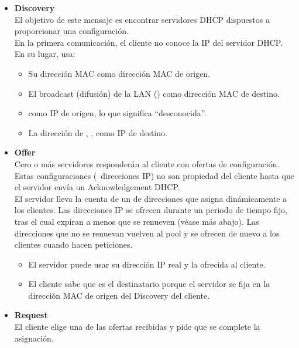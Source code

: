 \begin{itemize}

\item \textbf{Discovery}\\
El objetivo de este mensaje es encontrar servidores DHCP dispuestos a proporcionar
una configuración.\\[-0.3cm]

En la primera comunicación, el cliente
no conoce la IP del servidor DHCP. En su lugar, usa:
\begin{itemize}
\item Su dirección MAC como dirección MAC de origen.
\item El broadcast (difusión) de la LAN () como dirección MAC de destino.
\item {} como IP de origen, lo que significa ``desconocida''.
\item La dirección de  , , como IP de destino.
\end{itemize}

\vspace{0.25cm}
\item \textbf{Offer}\\
Cero o más servidores responderán al cliente con ofertas de configuración.
Estas configuraciones (\eg\ direcciones IP) no son propiedad del cliente
hasta que el servidor envía un Acknowledgement DHCP.\\[-0.3cm]

El servidor lleva la cuenta de un  de direcciones que asigna
dinámicamente a los clientes.
% 
Las direcciones IP se ofrecen durante un periodo de tiempo fijo, tras el cual expiran
a menos que se renueven (véase más abajo). Las direcciones que no se renuevan vuelven
al pool y se ofrecen de nuevo a los clientes cuando hacen peticiones.
\\[-0.3cm]

\begin{itemize}
\item El servidor puede usar su dirección IP real y la ofrecida al cliente.
\item El cliente sabe que es el destinatario porque el servidor se fija en la
dirección MAC de origen del Discovery del cliente.
\end{itemize}

\vspace{0.25cm}
\item \textbf{Request}\\
El cliente elige una de las ofertas recibidas y pide que se complete la
asignación.\\[-0.3cm]


\end{itemize}
